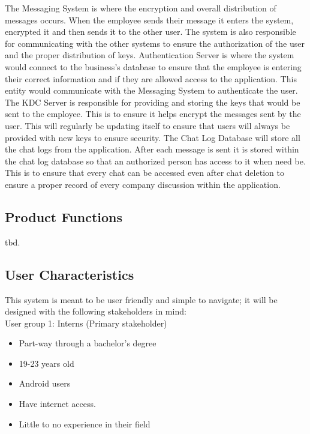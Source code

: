 \documentclass[]{article}
\begin{document}
\indent The Messaging System is where the encryption and overall distribution of messages occurs. When the employee sends their message it enters the system, encrypted it and then sends it to the other user. The system is also responsible for communicating with the other systems to ensure the authorization of the user and the proper distribution of keys.
\newline
\newline
\indent Authentication Server is where the system would connect to the business’s database to ensure that the employee is entering their correct information and if they are allowed access to the application. This entity would communicate with the Messaging System to authenticate the user.
\newline
\newline
\indent The KDC Server is responsible for providing and storing the keys that would be sent to the employee. This is to ensure it helps encrypt the messages sent by the user. This will regularly be updating itself to ensure that users will always be provided with new keys to ensure security.
\newline
\newline
\indent The Chat Log Database will store all the chat logs from the application. After each message is sent it is stored within the chat log database so that an authorized person has access to it when need be. This is to ensure that every chat can be accessed even after chat deletion to ensure a proper record of every company discussion within the application.

\subsection{Product Functions}
\label{sub:product_functions}
tbd.\\

\subsection{User Characteristics}
\label{sub:user_characteristics}
This system is meant to be user friendly and simple to navigate; it will be designed with the following stakeholders in mind:\\
User group 1: Interns (Primary stakeholder)
\begin{itemize}
    \item Part-way through a bachelor’s degree
    \item 19-23 years old
    \item Android users
    \item Have internet access.
    \item Little to no experience in their field
\end{itemize}
\end{document}
